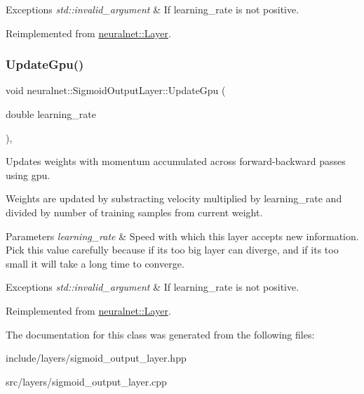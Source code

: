 \begin{DoxyExceptions}{Exceptions}
{\em std\+::invalid\+\_\+argument} & If learning\+\_\+rate is not positive. \\
\hline
\end{DoxyExceptions}


Reimplemented from \hyperlink{classneuralnet_1_1Layer_a24af23aba6bd257f90344d1c3d6d38b8}{neuralnet\+::\+Layer}.

\mbox{\label{classneuralnet_1_1SigmoidOutputLayer_ae5760686dccc5dc3ebd99e5bf7e7a0b0}} 
\subsubsection{\texorpdfstring{Update\+Gpu()}{UpdateGpu()}}
{\footnotesize\ttfamily void neuralnet\+::\+Sigmoid\+Output\+Layer\+::\+Update\+Gpu (\begin{DoxyParamCaption}\item[{double}]{learning\+\_\+rate }\end{DoxyParamCaption})\hspace{0.3cm}{\ttfamily [protected]}, {\ttfamily [virtual]}}



Updates weights with momentum accumulated across forward-\/backward passes using gpu. 

Weights are updated by substracting velocity multiplied by learning\+\_\+rate and divided by number of training samples from current weight.


\begin{DoxyParams}{Parameters}
{\em learning\+\_\+rate} & Speed with which this layer accepts new information. Pick this value carefully because if it\textquotesingle{}s too big layer can diverge, and if it\textquotesingle{}s too small it will take a long time to converge. \\
\hline
\end{DoxyParams}

\begin{DoxyExceptions}{Exceptions}
{\em std\+::invalid\+\_\+argument} & If learning\+\_\+rate is not positive. \\
\hline
\end{DoxyExceptions}


Reimplemented from \hyperlink{classneuralnet_1_1Layer_af7520597d321aae360329b70f9476073}{neuralnet\+::\+Layer}.



The documentation for this class was generated from the following files\+:\begin{DoxyCompactItemize}
\item 
include/layers/sigmoid\+\_\+output\+\_\+layer.\+hpp\item 
src/layers/sigmoid\+\_\+output\+\_\+layer.\+cpp\end{DoxyCompactItemize}
